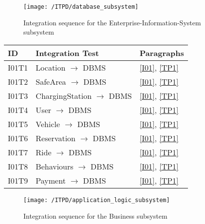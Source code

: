 	\begin{figure}[!ht]
	  \centering
	  \vspace{0.2cm}
	  \texttt{[image: /ITPD/database\_subsystem]}\\
	  \vspace{0.2cm}
	  \caption{Integration sequence for the Enterprise-Information-System subsystem} 
	  \label{fig:database_integration} 
	\end{figure}

	\begin{center}
		\vspace{0.6cm}
		\begin{tabular}{|l|l|l|}
			\hline
			\textbf{ID} & \textbf{Integration Test} & \textbf{Paragraphs} \bigstrut \\\hline
			\hline
			I01T1 & Location \ensuremath{\rightarrow} DBMS & \ref{I01}, \ref{TP1} \bigstrut \\\hline
			I01T2 & SafeArea \ensuremath{\rightarrow} DBMS & \ref{I01}, \ref{TP1} \bigstrut \\\hline
			I01T3 & ChargingStation \ensuremath{\rightarrow} DBMS & \ref{I01}, \ref{TP1} \bigstrut \\\hline
			I01T4 & User \ensuremath{\rightarrow} DBMS & \ref{I01}, \ref{TP1} \bigstrut \\\hline
			I01T5 & Vehicle \ensuremath{\rightarrow} DBMS & \ref{I01}, \ref{TP1} \bigstrut \\\hline
			I01T6 & Reservation \ensuremath{\rightarrow} DBMS & \ref{I01}, \ref{TP1} \bigstrut \\\hline
			I01T7 & Ride \ensuremath{\rightarrow} DBMS & \ref{I01}, \ref{TP1} \bigstrut \\\hline
			I01T8 & Behaviours \ensuremath{\rightarrow} DBMS & \ref{I01}, \ref{TP1} \bigstrut \\\hline
			I01T9 & Payment \ensuremath{\rightarrow} DBMS & \ref{I01}, \ref{TP1} \bigstrut \\\hline
		\end{tabular}
	\end{center}

	\newpage
	\begin{figure}[!ht]
	  \centering
	  \vspace{0.2cm}
	  \texttt{[image: /ITPD/application\_logic\_subsystem]}\\
	  \vspace{0.2cm}
	  \caption{Integration sequence for the Business subsystem} 
	  \label{fig:application_logic_subsystem} 
	\end{figure}

